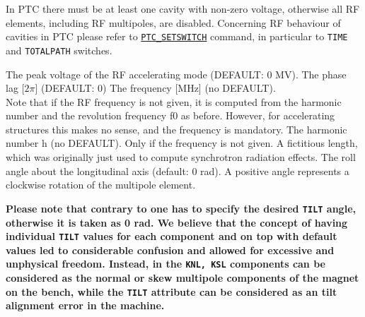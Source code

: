 In PTC there must be at least one cavity with non-zero voltage,
otherwise all RF elements, including RF multipoles, are disabled.
Concerning RF behaviour of cavities in PTC
please refer to \hyperref[sec:ptc-setswitch]{\texttt{PTC\_SETSWITCH}} command,
in particular to \texttt{TIME} and \texttt{TOTALPATH} switches.


\begin{madlist}
    The peak voltage of the RF accelerating mode (DEFAULT: 0 MV).
    The phase lag [$2\pi$] (DEFAULT: 0)
    The frequency [MHz] (no DEFAULT). \\
     Note that if the RF
     frequency is not given, it is computed from the harmonic
     number and the revolution frequency f0 as before. However, for
     accelerating structures this makes no sense, and the frequency
     is mandatory.
    The harmonic number h (no DEFAULT). Only if the
     frequency is not given.
    A fictitious length, which was originally just used to
     compute synchrotron radiation effects.
    The roll angle about the longitudinal axis (default: 0
     rad). A positive angle represents a clockwise rotation of the
     multipole element.

     \textbf{Please note that contrary to \madeight one has to specify the
       desired \texttt{TILT} angle, otherwise it is taken as 0 rad. We
       believe that the \madeight concept of having individual
       \texttt{TILT} values for each component and on top with default
       values led to considerable confusion and allowed for excessive
       and unphysical freedom. Instead, in \madx the \texttt{KNL, KSL}
       components can be considered as the normal or skew
       multipole components of the magnet on the bench, while the
       \texttt{TILT} attribute can be considered as an tilt alignment
       error in the machine.}


\end{madlist}

